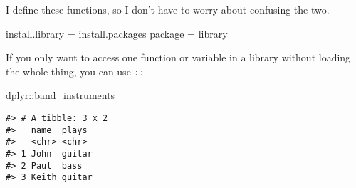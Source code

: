 \documentclass[
]{book}
\newenvironment{Shaded}{\begin{snugshade}}{\end{snugshade}}
\newcommand{\NormalTok}[1]{#1}
\newcommand{\OtherTok}[1]{\textcolor[rgb]{0.56,0.35,0.01}{#1}}
\newcommand{\SpecialCharTok}[1]{\textcolor[rgb]{0.00,0.00,0.00}{#1}}
\begin{document}
I define these functions, so I don't have to worry about confusing the two.

\begin{Shaded}
\begin{Highlighting}[]
\NormalTok{install.library }\OtherTok{=}\NormalTok{ install.packages}
\NormalTok{package }\OtherTok{=}\NormalTok{ library}
\end{Highlighting}
\end{Shaded}

If you only want to access one function or variable in a library without loading the whole thing, you can use \texttt{::}

\begin{Shaded}
\begin{Highlighting}[]
\NormalTok{dplyr}\SpecialCharTok{::}\NormalTok{band\_instruments}
\end{Highlighting}
\end{Shaded}

\begin{verbatim}
#> # A tibble: 3 x 2
#>   name  plays 
#>   <chr> <chr> 
#> 1 John  guitar
#> 2 Paul  bass  
#> 3 Keith guitar
\end{verbatim}
\end{document}
